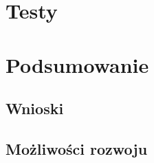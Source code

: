 \documentclass[eng,printmode,openany]{mgr}
\begin{document}
\chapter{Testy}

\newpage
\chapter{Podsumowanie}
\section{Wnioski}
\section{Możliwości rozwoju}


%
%
%
\end{document}
